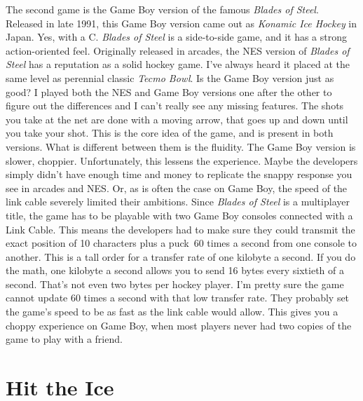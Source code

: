 \documentclass{book}
\let\oldcenter\center
\let\oldendcenter\endcenter
\renewenvironment{center}{\setlength\topsep{0pt}\oldcenter}{\oldendcenter}
\begin{document}
\begin{center}
\quad\vspace{4pt}
\quad\vspace{4pt}
\end{center}

The second game is the Game Boy version of the famous \emph{Blades of Steel}. Released in late 1991, this Game Boy version came out as \emph{Konamic Ice Hockey} in Japan. Yes, with a C. \emph{Blades of Steel} is a side-to-side game, and it has a strong action-oriented feel. Originally released in arcades, the NES version of \emph{Blades of Steel} has a reputation as a solid hockey game. I’ve always heard it placed at the same level as perennial classic \emph{Tecmo Bowl}. Is the Game Boy version just as good? I played both the NES and Game Boy versions one after the other to figure out the differences and I can’t really see any missing features. The shots you take at the net are done with a moving arrow, that goes up and down until you take your shot. This is the core idea of the game, and is present in both versions. What is different between them is the fluidity. The Game Boy version is slower, choppier. Unfortunately, this lessens the experience. Maybe the developers simply didn’t have enough time and money to replicate the snappy response you see in arcades and NES. Or, as is often the case on Game Boy, the speed of the link cable severely limited their ambitions. Since \emph{Blades of Steel} is a multiplayer title, the game has to be playable with two Game Boy consoles connected with a Link Cable. This means the developers had to make sure they could transmit the exact position of 10 characters plus a puck~60 times a second from one console to another. This is a tall order for a transfer rate of one kilobyte a second. If you do the math, one kilobyte a second allows you to send 16 bytes every sixtieth of a second. That’s not even two bytes per hockey player. I’m pretty sure the game cannot update 60 times a second with that low transfer rate. They probably set the game’s speed to be as fast as the link cable would allow. This gives you a choppy experience on Game Boy, when most players never had two copies of the game to play with a friend.

\FloatBarrier\needspace{10mm}\section*{Hit the Ice}\nopagebreak[4]
\end{document}
